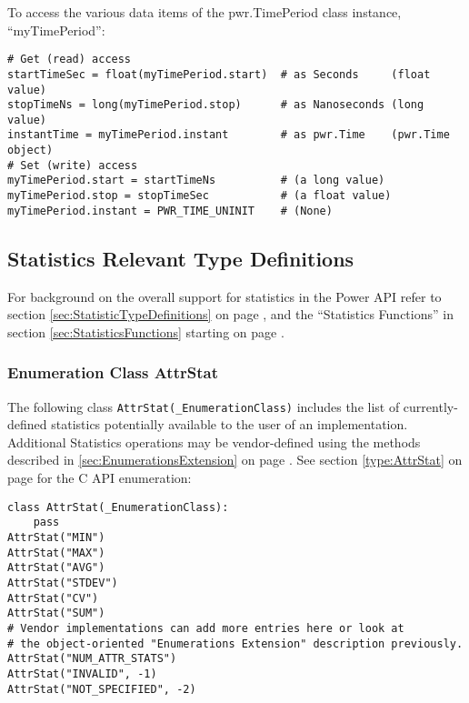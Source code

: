 To access the various data items of the pwr.TimePeriod class instance,
``myTimePeriod'': 

\begin{center}\begin{minipage}{.95\linewidth}\begin{lstlisting}
# Get (read) access
startTimeSec = float(myTimePeriod.start)  # as Seconds     (float value)
stopTimeNs = long(myTimePeriod.stop)      # as Nanoseconds (long value)
instantTime = myTimePeriod.instant        # as pwr.Time    (pwr.Time object)
# Set (write) access
myTimePeriod.start = startTimeNs          # (a long value)
myTimePeriod.stop = stopTimeSec           # (a float value)
myTimePeriod.instant = PWR_TIME_UNINIT    # (None)
\end{lstlisting}\end{minipage}\end{center}

\subsection{Statistics Relevant Type Definitions}
\label{sec:PythonStatisticsRelevantTypeDefinitions}

For background on the overall support for statistics in the Power API refer to
section \ref{sec:StatisticTypeDefinitions} on page
\pageref{sec:StatisticTypeDefinitions}, and  the ``Statistics Functions'' in
section \ref{sec:StatisticsFunctions} starting on page
\pageref{sec:StatisticsFunctions}.

\subsubsection{Enumeration Class AttrStat}\label{class:AttrStat}

The following class \texttt{AttrStat(_EnumerationClass)} includes the list of
currently-defined statistics potentially available to the user of an
implementation. Additional Statistics operations may be vendor-defined using
the methods described in \ref{sec:EnumerationsExtension} on page
\pageref{sec:EnumerationsExtension}. See section \ref{type:AttrStat} on page
\pageref{type:AttrStat} for the C API enumeration:

\begin{center}\begin{minipage}{.95\linewidth}\begin{lstlisting}
class AttrStat(_EnumerationClass):
    pass
AttrStat("MIN")
AttrStat("MAX")
AttrStat("AVG")
AttrStat("STDEV")
AttrStat("CV")
AttrStat("SUM")
# Vendor implementations can add more entries here or look at  
# the object-oriented "Enumerations Extension" description previously. 
AttrStat("NUM_ATTR_STATS")
AttrStat("INVALID", -1)
AttrStat("NOT_SPECIFIED", -2)
\end{lstlisting}\end{minipage}\end{center}

